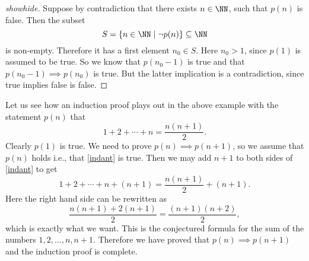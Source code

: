 \documentclass{article}
\begin{document}
\begin{proof}[showhide]
Suppose by contradiction that there exists $n\in \NN$, such that
$p(n)$ is false. Then the subset
$$
S = \{n\in \NN \mid \neg p(n)\}\subseteq \NN
$$
is non-empty. Therefore it has a first element $n_0\in S$. 
Here $n_0 > 1$, since $p(1)$ is assumed to be true. So we
know that $p(n_0-1)$ is true and that
$p(n_0-1)\implies p(n_0)$ is true. But the latter
implication is a contradiction, since true implies
false is false.
\end{proof}

Let us see how an induction proof plays out in the above example
with the statement $p(n)$ that
\begin{equation}\label{indant}
1 + 2 + \cdots + n = \frac{n(n+1)}{2}.
\end{equation}
Clearly $p(1)$ is true. We need to prove $p(n)\implies p(n+1)$, so
we assume that $p(n)$ holds i.e., that \eqref{indant} is true.
Then we may add $n+1$ to both sides of \eqref{indant} to get
$$
1 + 2 + \cdots + n + (n+1) = \frac{n(n+1)}{2} + (n+1).
$$
Here the right hand side can be rewritten as
$$
\frac{n(n+1) + 2(n+1)}{2} = \frac{(n+1)(n+2)}{2},
$$
which is exactly what we want. This is the conjectured formula for
the sum of the numbers $1, 2, \dots, n, n+1$. Therefore
we have proved that $p(n)\implies p(n+1)$ and the induction
proof is complete.
\end{document}
